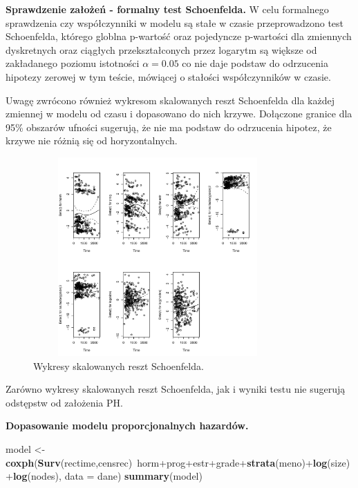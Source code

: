 \documentclass[]{article}
\newenvironment{Shaded}{}{}
\newcommand{\KeywordTok}[1]{\textcolor[rgb]{0.00,0.44,0.13}{\textbf{{#1}}}}
\newcommand{\DataTypeTok}[1]{\textcolor[rgb]{0.56,0.13,0.00}{{#1}}}
\newcommand{\StringTok}[1]{\textcolor[rgb]{0.25,0.44,0.63}{{#1}}}
\newcommand{\NormalTok}[1]{{#1}}
\begin{document}
\textbf{Sprawdzenie założeń - formalny test Schoenfelda.} \newline
W celu formalnego sprawdzenia czy współczynniki w modelu są stałe w
czasie przeprowadzono test Schoenfelda, którego globlna p-wartość oraz
pojedyncze p-wartości dla zmiennych dyskretnych oraz ciągłych
przekształconych przez logarytm są większe od zakładanego poziomu
istotności \(\alpha=0.05\) co nie daje podstaw do odrzucenia hipotezy
zerowej w tym teście, mówiącej o stałości współczynników w czasie.

Uwagę zwrócono również wykresom skalowanych reszt Schoenfelda dla
każdej zmiennej w modelu od czasu i dopasowano do nich krzywe. Dołączone granice dla 95\% obszarów ufności sugerują, że nie ma podstaw do odrzucenia hipotez, że krzywe nie różnią się od horyzontalnych.

\begin{figure}[hbt!]
\vspace{-10pt}
  \begin{center}
      \includegraphics[width=0.85\textwidth, height=3in]{skal_res_shen.pdf}
      \caption{Wykresy skalowanych reszt Schoenfelda.}
   \end{center}
\end{figure}

Zarówno wykresy skalowanych reszt Schoenfelda, jak i wyniki testu nie
sugerują odstępstw od założenia PH.

\textbf{Dopasowanie modelu proporcjonalnych hazardów.} \newline

\begin{Shaded}
\begin{Highlighting}[]
\NormalTok{model <-}\StringTok{ }\KeywordTok{coxph}\NormalTok{(}\KeywordTok{Surv}\NormalTok{(rectime,censrec)~horm+prog+estr+grade+}\KeywordTok{strata}\NormalTok{(meno)+}\KeywordTok{log}\NormalTok{(size)+}\KeywordTok{log}\NormalTok{(nodes), }
               \DataTypeTok{data =} \NormalTok{dane) }
\KeywordTok{summary}\NormalTok{(model)}
\end{Highlighting}
\end{Shaded}
\end{document}
